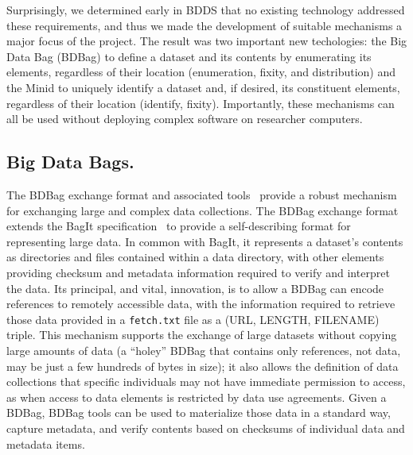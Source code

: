 \documentclass[11pt]{article}
\begin{document}
Surprisingly, we determined early in BDDS that no existing technology addressed these requirements,
and thus we made the development of suitable mechanisms a major focus of the project.
The result was two important new techologies:
the Big Data Bag (BDBag) to define a dataset and its contents by enumerating its elements, regardless of their location (enumeration, fixity, and distribution)
and the Minid to uniquely identify a dataset and, if desired, its constituent elements, regardless of their location (identify, fixity).
Importantly, these mechanisms can all be used without deploying complex software on researcher computers.

\subsection{Big Data Bags.}

The BDBag exchange format and associated tools~\cite{chard16} provide a robust mechanism for exchanging large and complex data collections. 
The BDBag exchange format extends the BagIt specification~\cite{Kunze2015} to provide a self-describing format for representing large data. 
In common with BagIt, it represents a dataset's contents as directories and files contained within a data directory,
with other elements providing checksum and metadata information required to verify and interpret the data. 
Its principal, and vital, innovation, is to allow a BDBag can encode references to remotely accessible data, with the information required to retrieve those data provided in a \texttt{fetch.txt} file as a (URL, LENGTH, FILENAME) triple. 
This mechanism supports the exchange of large datasets without copying large amounts of data (a ``holey'' BDBag that contains only references, not data, may be just a few hundreds of bytes in size); it also allows the definition of data collections that specific individuals may not have immediate permission to access, as when access to data elements is restricted by data use agreements.
Given a BDBag, BDBag tools can be used to materialize those data in a standard way, capture metadata, and verify contents based on checksums of individual data and metadata items.
\end{document}
